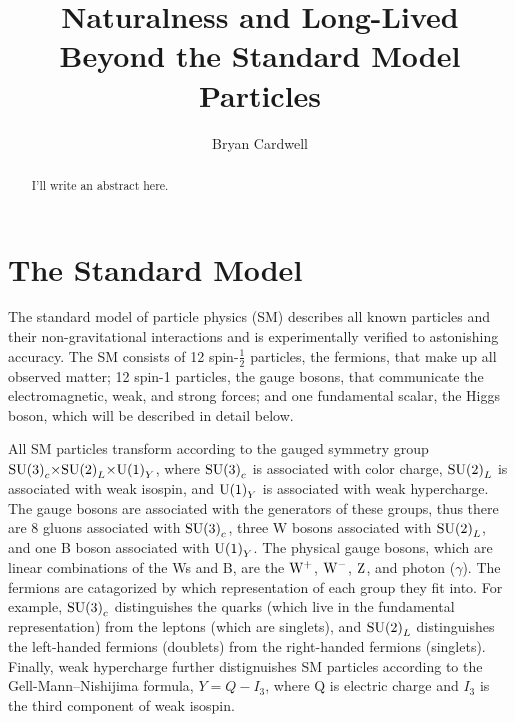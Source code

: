 \documentclass[12pt]{article}
\title{Naturalness and Long-Lived Beyond the Standard Model Particles}
\author{Bryan Cardwell}
\begin{document}
\singlespacing
\maketitle

\begin{abstract}

I'll write an abstract here.

\end{abstract}

\newpage
\tableofcontents
\newpage
\doublespacing
{}

\section{The Standard Model}
    The standard model of particle physics (SM) describes all known particles and their non-gravitational interactions and is experimentally verified to astonishing  accuracy. The SM consists of \num{12} spin-$\frac{1}{2}$ particles, the fermions, that make up all observed matter; \num{12} spin-1 particles, the gauge bosons, that communicate the electromagnetic, weak, and strong forces; and one fundamental scalar, the Higgs boson, which will be described in detail below.
    
    All SM particles transform according to the gauged symmetry group $\mathrm{SU} {\left(3\right)}_c {\times} \mathrm{SU} {\left(2\right)}_L {\times} \mathrm{U} {\left(1\right)}_Y$, where $\mathrm{SU} {\left(3\right)}_c$ is associated with color charge, $\mathrm{SU} {\left(2\right)}_L$ is associated with weak isospin, and $\mathrm{U} {\left(1\right)}_Y$ is associated with weak hypercharge. The gauge bosons are associated with the generators of these groups, thus there are \num{8} gluons associated with $\mathrm{SU} {\left(3\right)}_c$, three W bosons associated with $\mathrm{SU} {\left(2\right)}_L$, and one B boson associated with $\mathrm{U} {\left(1\right)}_Y$. The physical gauge bosons, which are linear combinations of the Ws and B, are the $\mathrm{W}^+$, $\mathrm{W}^-$, $\mathrm{Z}$, and photon ($\gamma$). The fermions are catagorized by which representation of each group they fit into. For example, $\mathrm{SU} {\left(3\right)}_c$ distinguishes the quarks (which live in the fundamental representation) from the leptons (which are singlets), and $\mathrm{SU} {\left(2\right)}_L$ distinguishes the left-handed fermions (doublets) from the right-handed fermions (singlets). Finally, weak hypercharge further distignuishes SM particles according to the Gell-Mann--Nishijima formula, $Y=Q-I_3$, where Q is electric charge and $I_3$ is the third component of weak isospin.
\end{document}
